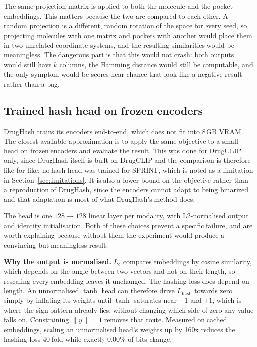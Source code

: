\documentclass[10pt,a4paper]{article}
\begin{document}
The same projection matrix is applied to both the molecule and the pocket embeddings. This
matters because the two are compared to each other. A random projection is a different, random
rotation of the space for every seed, so projecting molecules with one matrix and pockets with
another would place them in two unrelated coordinate systems, and the resulting similarities
would be meaningless. The dangerous part is that this would not crash: both outputs would
still have $k$ columns, the Hamming distance would still be computable, and the only symptom
would be scores near chance that look like a negative result rather than a bug.

\subsection{Trained hash head on frozen encoders}\label{sec:hash-head-method}
DrugHash trains its encoders end-to-end, which does not fit into 8\,GB VRAM. The closest
available approximation is to apply the same objective to a small head on frozen encoders and
evaluate the result. This was done for DrugCLIP only, since DrugHash itself is built on
DrugCLIP and the comparison is therefore like-for-like; no hash head was trained for SPRINT,
which is noted as a limitation in Section~\ref{sec:limitations}. It is also a lower bound on the objective rather
than a reproduction of DrugHash, since the encoders cannot adapt to being binarized and that
adaptation is most of what DrugHash's method does.

The head is one $128 \rightarrow 128$ linear layer per modality, with L2-normalised output and
identity initialisation. Both of these choices prevent a specific failure, and are worth
explaining because without them the experiment would produce a convincing but meaningless
result.

\textbf{Why the output is normalised.} $L_c$ compares embeddings by cosine similarity, which
depends on the angle between two vectors and not on their length, so rescaling every embedding
leaves it unchanged. The hashing loss does depend on length. An unnormalised $\tanh$ head can
therefore drive $L_{\text{hash}}$ towards zero simply by inflating its weights until $\tanh$
saturates near $-1$ and $+1$, which is where the sign pattern already lies, without changing
which side of zero any value falls on. Constraining $\lVert y \rVert = 1$ removes that route. Measured on cached
embeddings, scaling an unnormalised head's weights up by 160x reduces the hashing loss 40-fold
while exactly 0.00\% of bits change.
\end{document}
